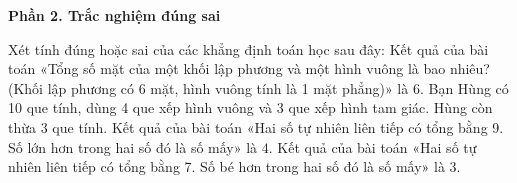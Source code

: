 \textbf{Phần 2. Trắc nghiệm đúng sai}

\begin{ex} %
Xét tính đúng hoặc sai của các khẳng định toán học sau đây:
\choiceTF
{Kết quả của bài toán «Tổng số mặt của một khối lập phương và một hình vuông là bao nhiêu? (Khối lập phương có 6 mặt, hình vuông tính là 1 mặt phẳng)» là $6$.}
{\True Bạn Hùng có 10 que tính, dùng 4 que xếp hình vuông và 3 que xếp hình tam giác. Hùng còn thừa $3$ que tính.}
{Kết quả của bài toán «Hai số tự nhiên liên tiếp có tổng bằng 9. Số lớn hơn trong hai số đó là số mấy» là $4$.}
{\True Kết quả của bài toán «Hai số tự nhiên liên tiếp có tổng bằng 7. Số bé hơn trong hai số đó là số mấy» là $3$.}
\end{ex}

